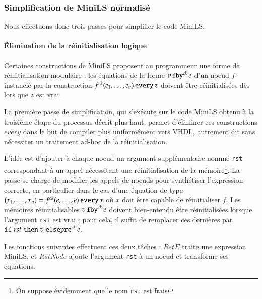 \documentclass[9pt,a4paper]{article}
\newcommand{\mybox}[1]{\mbox{\tt{#1}}}
\newcommand{\Fby}[2]{#1 \, \mybox{fby}^{ck} \, #2}
\newcommand{\Pre}[1]{\mybox{pre}^{ck} \, #1}
\newcommand{\Every}[4]{#1^{ck}(#2,\dots,#3) \, \mybox{every} \, #4}
\newcommand{\If}[3]{\mybox{if} \; #1 \; \mybox{then} \; #2 \; \mybox{else} \; #3}
\begin{document}

\subsubsection{Simplification de MiniLS normalisé}

Nous effectuons donc trois passes pour simplifier le code MiniLS.

\paragraph{Élimination de la réinitialisation logique}

Certaines constructions de MiniLS proposent au programmeur une forme de
réinitialisation modulaire : les équations de la forme $\Fby{v}{e}$ d'un noeud
$f$ instancié par la construction $\Every{f}{e_1}{e_n}{z}$ doivent-être
réinitialisées dès lors que $z$ est vrai.

La première passe de simplification, qui s'exécute sur le code MiniLS obtenu à
la troisième étape du processus décrit plus haut, permet d'éliminer ces
constructions $every$ dans le but de compiler plus uniformément vers VHDL,
autrement dit sans nécessiter un traitement ad-hoc de la réinitialisation.

L'idée est d'ajouter à chaque noeud un argument supplémentaire nommé
\texttt{rst} correspondant à un appel nécessitant une réinitialisation de la
mémoire\footnote{On suppose évidemment que le nom \texttt{rst} est frais}. La
passe se charge de modifier les appels de noeuds pour synthétiser l'expression
correcte, en particulier dans le cas d'une équation de type $(x_1, \dots, x_n) =
\Every{f}{e}{e}{x}$ où $x$ doit être capable de réinitialiser $f$. Les mémoires
réinitialisables $\Fby{v}{e}$ doivent bien-entendu être réinitialisées lorsque
l'argument \texttt{rst} est vrai ; pour cela, il suffit de remplacer ces
dernières par $\If{rst}{v}{\newline \Pre{e}}$.

Les fonctions suivantes effectuent ces deux tâches : $RstE$ traite une
expression MiniLS, et $RstNode$ ajoute l'argument \texttt{rst} à un noeud et
transforme ses équations.

\newcommand{\re}[1]{RstE(#1)}
\newcommand{\rstn}[1]{RstNode(#1)}
\end{document}
